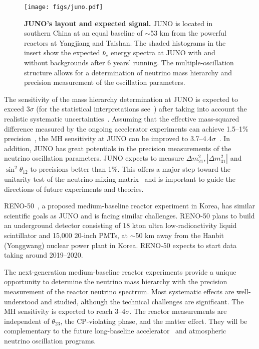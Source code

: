 \begin{figure}[tb] \label{fig:juno}
  \centering
  \texttt{[image: figs/juno.pdf]}
  \caption{{\bf JUNO's layout and expected signal.} JUNO is located in southern China at an equal baseline of $\sim$53 km from the powerful reactors at Yangjiang and Taishan. The shaded histograms in the insert show the expected $\bar\nu_e$ energy spectra at JUNO with and without backgrounds after 6 years' running. The multiple-oscillation structure allows for a determination of neutrino mass hierarchy and precision measurement of the oscillation parameters.}
\end{figure}

The sensitivity of the mass hierarchy determination at JUNO is expected to exceed 3$\sigma$ (for the statistical interpretations see~\cite{Qian-Stat,Blennow}) after taking into account the realistic systematic uncertainties~\cite{Li-PRD13,MBRwitepaper}. 
Assuming that the effective mass-squared difference measured by the ongoing accelerator experiments can achieve 1.5--1\% precision~\cite{Agarwalla}, the MH sensitivity at JUNO can be improved to 3.7--4.4$\sigma$~\cite{Li-PRD13}. 
In addition, JUNO has great potentials in the precision measurements of the neutrino oscillation parameters. JUNO expects to measure $\Delta m^2_{21}, |\Delta m^2_{31}|$ and $\sin^2 \theta_{12}$ to precisions better than 1\%. This offers a major step toward the unitarity test of the neutrino mixing matrix~\cite{unitarity13} and is important to guide the directions of future experiments and theories. 

RENO-50~\cite{RENO-50}, a proposed medium-baseline reactor experiment in Korea, has similar scientific goals as JUNO and is facing similar challenges. RENO-50 plans to build an underground detector consisting of 18 kton ultra low-radioactivity liquid scintillator and 15,000 20-inch PMTs, at $\sim$50 km away from the Hanbit (Yonggwang) nuclear power plant in Korea. RENO-50 expects to start data taking around 2019--2020.

The next-generation medium-baseline reactor experiments provide a unique opportunity to determine the neutrino mass hierarchy with the precision measurement of the reactor neutrino spectrum.
Most systematic effects are well-understood and studied, although the technical challenges are significant. 
The MH sensitivity is expected to reach 3--4$\sigma$.
The reactor measurements are independent of $\theta_{23}$, the CP-violating phase, and the matter effect. 
They will be complementary to the future long-baseline accelerator~\cite{LBNE} and atmospheric~\cite{PINGU} neutrino oscillation programs. 



